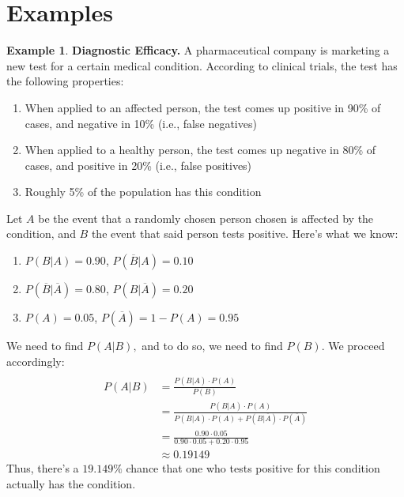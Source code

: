\documentclass[a4paper]{article}
\theoremstyle{definition}
\newtheorem{exmp}{Example}[section]
\begin{document}
\section{Examples}
\begin{exmp}
\textbf{Diagnostic Efficacy.} A pharmaceutical company is marketing a new test for a certain medical condition. According to clinical trials, the test has the following properties:
\begin{enumerate}
\item When applied to an affected person, the test comes up positive in 90\% of cases, and negative in 10\% (i.e., false negatives)
\item When applied to a healthy person, the test comes up negative in 80\% of cases, and positive in 20\% (i.e., false positives)
\item Roughly 5\% of the population has this condition
\end{enumerate}
Let $A$ be the event that a randomly chosen person chosen is affected by the condition, and $B$ the event that said person tests positive. Here's what we know:
\begin{enumerate}
\item $P(B|A)=0.90$, $P(\overline B|A)=0.10$
\item $P(\overline B|\overline A)=0.80$, $P(B|\overline A)=0.20$
\item $P(A)=0.05$, $P(\overline A)=1-P(A)=0.95$
\end{enumerate}
We need to find $P(A|B),$ and to do so, we need to find $P(B)$. We proceed accordingly:
\begin{align*}
\\P(A|B)&=\frac{P(B|A)\cdot P(A)}{P(B)}
\\{}&=\frac{P(B|A)\cdot P(A)}{P(B|A)\cdot P(A)+P(B|\overline A)\cdot P(\overline A)}
\\{}&=\frac{0.90\cdot 0.05}{0.90\cdot 0.05+0.20\cdot 0.95}
\\{}&\approx 0.19149
\end{align*}
Thus, there's a $19.149\%$ chance that one who tests positive for this condition actually has the condition.

\end{exmp}
\end{document}
